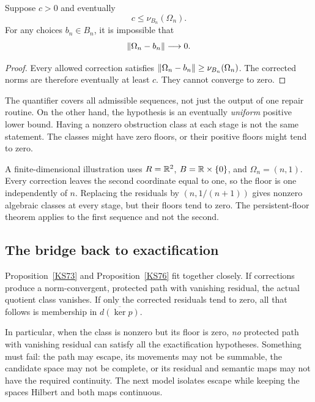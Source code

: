 \begin{proposition}\label{KS77}
Suppose \(c>0\) and eventually
\[
 c\le\nu_{B_n}(\Omega_n).
\]
For any choices \(b_n\in B_n\), it is impossible that
\[
 \left\lVert\Omega_n-b_n\right\rVert\longrightarrow0.
\]
\end{proposition}
\begin{proof}
Every allowed correction satisfies
\(\left\lVert\Omega_n-b_n\right\rVert\ge\nu_{B_n}(\Omega_n)\). The corrected norms are therefore eventually at least \(c\). They cannot converge to zero.
\end{proof}
The quantifier covers all admissible sequences, not just the output of one repair routine. On the other hand, the hypothesis is an eventually \emph{uniform} positive lower bound. Having a nonzero obstruction class at each stage is not the same statement. The classes might have zero floors, or their positive floors might tend to zero.

A finite-dimensional illustration uses \(R=\mathbb R^2\), \(B=\mathbb R\times\{0\}\), and \(\Omega_n=(n,1)\). Every correction leaves the second coordinate equal to one, so the floor is one independently of \(n\). Replacing the residuals by \((n,1/(n+1))\) gives nonzero algebraic classes at every stage, but their floors tend to zero. The persistent-floor theorem applies to the first sequence and not the second.

\subsection{The bridge back to exactification}
Proposition~\ref{KS73} and Proposition~\ref{KS76} fit together closely. If corrections produce a norm-convergent, protected path with vanishing residual, the actual quotient class vanishes. If only the corrected residuals tend to zero, all that follows is membership in \(\overline{d(\ker p)}\).

In particular, when the class is nonzero but its floor is zero, \emph{no} protected path with vanishing residual can satisfy all the exactification hypotheses. Something must fail: the path may escape, its movements may not be summable, the candidate space may not be complete, or its residual and semantic maps may not have the required continuity. The next model isolates escape while keeping the spaces Hilbert and both maps continuous.
